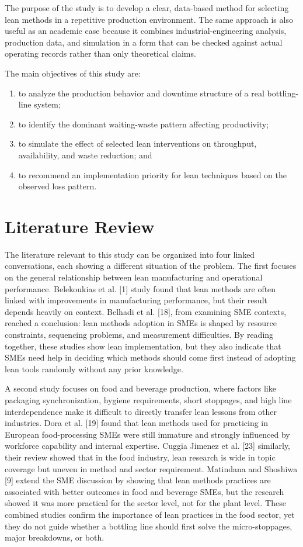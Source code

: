 \documentclass[12pt,a4paper]{article}
\begin{document}
The purpose of the study is to develop a clear, data-based method for selecting lean methods in a repetitive production environment. The same approach is also useful as an academic case because it combines industrial-engineering analysis, production data, and simulation in a form that can be checked against actual operating records rather than only theoretical claims.

The main objectives of this study are:
\begin{enumerate}
    \item to analyze the production behavior and downtime structure of a real bottling-line system;
    \item to identify the dominant waiting-waste pattern affecting productivity;
    \item to simulate the effect of selected lean interventions on throughput, availability, and waste reduction; and
    \item to recommend an implementation priority for lean techniques based on the observed loss pattern.
\end{enumerate}

\section{Literature Review}
The literature relevant to this study can be organized into four linked conversations, each showing a different situation of the problem. The first focuses on the general relationship between lean manufacturing and operational performance. Belekoukias et al. [1] study found that lean methods are often linked with improvements in manufacturing performance, but their result depends heavily on context. Belhadi et al. [18], from examining SME contexts, reached a conclusion: lean methods adoption in SMEs is shaped by resource constraints, sequencing problems, and measurement difficulties. By reading together, these studies show lean implementation, but they also indicate that SMEs need help in deciding which methods should come first instead of adopting lean tools randomly without any prior knowledge.

A second study focuses on food and beverage production, where factors like packaging synchronization, hygiene requirements, short stoppages, and high line interdependence make it difficult to directly transfer lean lessons from other industries. Dora et al. [19] found that lean methods used for practicing in European food-processing SMEs were still immature and strongly influenced by workforce capability and internal expertise. Cuggia Jimenez et al. [23] similarly, their review showed that in the food industry, lean research is wide in topic coverage but uneven in method and sector requirement. Matindana and Shoshiwa [9] extend the SME discussion by showing that lean methods practices are associated with better outcomes in food and beverage SMEs, but the research showed it was more practical for the sector level, not for the plant level. These combined studies confirm the importance of lean practices in the food sector, yet they do not guide whether a bottling line should first solve the micro-stoppages, major breakdowns, or both.
\end{document}
